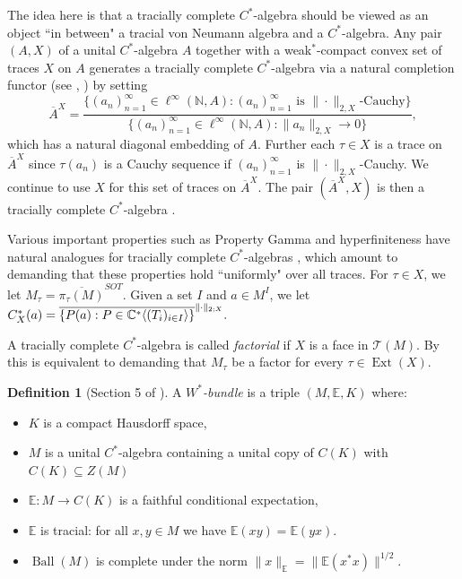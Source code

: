 \documentclass[10pt]{amsart}
\theoremstyle{definition}
\newtheorem{defn}[thm]{Definition}
\numberwithin{equation}{section}
\newcommand{\bC}{{\mathbb C}}
\newcommand{\bE}{{\mathbb E}}
\newcommand{\bN}{{\mathbb N}}
\newcommand{\cT}{{\mathcal T}}
\DeclareMathOperator{\Ball}{Ball}
\DeclareMathOperator{\Ext}{Ext}
\DeclarePairedDelimiter{\ip}{\langle}{\rangle}
\begin{document}
The idea here is that a tracially complete $C^{*}$-algebra should be viewed as an object ``in between" a tracial von Neumann algebra and a $C^{*}$-algebra. Any pair $(A,X)$ of a unital $C^{*}$-algebra $A$ together with a weak$^{*}$-compact convex set of traces $X$ on $A$ generates a tracially complete $C^{*}$-algebra via a natural completion functor (see \cite{OzawaBundle}, \cite[Section 3.3]{TraciallyComplete}) 
by setting
\[\overline{A}^{X}=\frac{\{(a_{n})_{n=1}^{\infty}\in \ell^{\infty}(\bN,A):(a_{n})_{n=1}^{\infty} \text{ is $\|\cdot\|_{2,X}$-Cauchy}\}}{\{(a_{n})_{n=1}^{\infty}\in \ell^{\infty}(\bN,A):\|a_{n}\|_{2,X}\to 0\}},\]
which has a natural diagonal embedding of $A$. Further each $\tau\in X$ is a trace on $\overline{A}^{X}$ since $\tau(a_{n})$ is a Cauchy sequence if $(a_{n})_{n=1}^{\infty}$ is $\|\cdot\|_{2,X}$-Cauchy. We continue to use $X$ for this set of traces on $\overline{A}^{X}$. The pair $(\overline{A}^{X},X)$ is then a tracially complete $C^{*}$-algebra \cite[Proposition 3.23]{TraciallyComplete}.



Various important properties such as Property Gamma and hyperfiniteness have natural analogues for tracially complete $C^{*}$-algebras \cite{TraciallyComplete}, which amount to demanding that these properties hold ``uniformly" over all traces. For $\tau\in X$, we let $M_{\tau}=\overline{\pi_{\tau}(M)}^{SOT}$. Given a set $I$ and $a\in M^{I}$, we let $C^{*}_{X}(a)=\overline{\{P(a):P\in \bC^{*}\ip{(T_{i})_{i\in I}}\}}^{\|\cdot\|_{2;X}}.$

A tracially complete $C^{*}$-algebra is called \emph{factorial}
 if $X$ is a face in $\cT(M)$. By \cite[Proposition 3.14]{TraciallyComplete} this is equivalent to demanding that $M_{\tau}$ be a factor for every $\tau\in \Ext(X)$. 

\begin{defn}[Section 5 of \cite{OzawaBundle}] \label{defn:W*bundle}
A \emph{$W^{*}$-bundle} is a triple $(M,\bE,K)$ where:
\begin{itemize}
    \item $K$ is a compact Hausdorff space,
    \item $M$ is a unital $C^{*}$-algebra containing a unital copy of $C(K)$ with $C(K)\subseteq Z(M)$
    \item $\bE\colon M\to C(K)$ is a faithful conditional expectation,
    \item $\bE$ is tracial: for all $x,y\in M$ we have $\bE(xy)=\bE(yx)$. 
    \item $\Ball(M)$ is complete under the norm $\|x\|_{\bE}=\|\bE(x^{*}x)\|^{1/2}.$
\end{itemize}
\end{defn}
\end{document}
